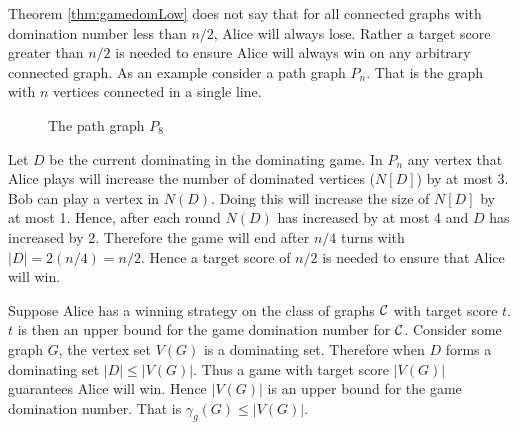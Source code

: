 Theorem \ref{thm:gamedomLow} does not say that for all connected graphs with domination number less than $n/2$, Alice will always lose. Rather a target score greater than $n/2$ is needed to ensure Alice will always win on any arbitrary connected graph. As an example consider a path graph $P_n$. That is the graph with $n$ vertices connected in a single line. 

\begin{figure}[H]
    \centering
    \caption{The path graph $P_8$}
\end{figure}
Let $D$ be the current dominating in the dominating game. In $P_n$ any vertex that Alice plays will increase the number of dominated vertices ($N[D]$) by at most 3. Bob can play a vertex in $N(D)$. Doing this will increase the size of $N[D]$ by at most 1. Hence, after each round $N(D)$ has increased by at most 4 and $D$ has increased by 2. Therefore the game will end after $n/4$ turns with $|D| = 2(n/4) = n/2$. Hence a target score of $n/2$ is needed to ensure that Alice will win.


Suppose Alice has a winning strategy on the class of graphs $\mathcal{C}$ with target score $t$. $t$ is then an upper bound for the game domination number for $\mathcal{C}$. Consider some graph $G$, the vertex set $V(G)$ is a dominating set. Therefore when $D$ forms a dominating set $|D|\leq |V(G)|$. Thus a game with target score $|V(G)|$ guarantees Alice will win. Hence $|V(G)|$ is an upper bound for the game domination number. That is $\gamma_g(G) \leq |V(G)|$. 

